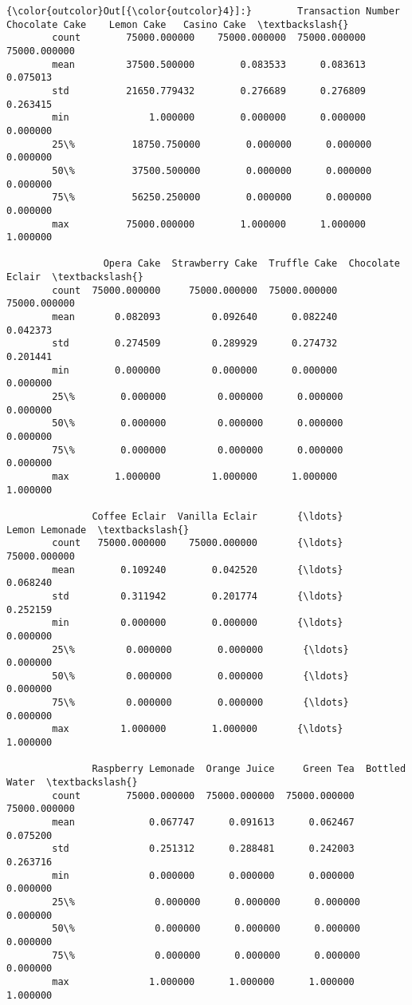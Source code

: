\documentclass[11pt]{article}
\begin{document}
\begin{Verbatim}[commandchars=\\\{\}]
{\color{outcolor}Out[{\color{outcolor}4}]:}        Transaction Number  Chocolate Cake    Lemon Cake   Casino Cake  \textbackslash{}
        count        75000.000000    75000.000000  75000.000000  75000.000000   
        mean         37500.500000        0.083533      0.083613      0.075013   
        std          21650.779432        0.276689      0.276809      0.263415   
        min              1.000000        0.000000      0.000000      0.000000   
        25\%          18750.750000        0.000000      0.000000      0.000000   
        50\%          37500.500000        0.000000      0.000000      0.000000   
        75\%          56250.250000        0.000000      0.000000      0.000000   
        max          75000.000000        1.000000      1.000000      1.000000   
        
                 Opera Cake  Strawberry Cake  Truffle Cake  Chocolate Eclair  \textbackslash{}
        count  75000.000000     75000.000000  75000.000000      75000.000000   
        mean       0.082093         0.092640      0.082240          0.042373   
        std        0.274509         0.289929      0.274732          0.201441   
        min        0.000000         0.000000      0.000000          0.000000   
        25\%        0.000000         0.000000      0.000000          0.000000   
        50\%        0.000000         0.000000      0.000000          0.000000   
        75\%        0.000000         0.000000      0.000000          0.000000   
        max        1.000000         1.000000      1.000000          1.000000   
        
               Coffee Eclair  Vanilla Eclair       {\ldots}         Lemon Lemonade  \textbackslash{}
        count   75000.000000    75000.000000       {\ldots}           75000.000000   
        mean        0.109240        0.042520       {\ldots}               0.068240   
        std         0.311942        0.201774       {\ldots}               0.252159   
        min         0.000000        0.000000       {\ldots}               0.000000   
        25\%         0.000000        0.000000       {\ldots}               0.000000   
        50\%         0.000000        0.000000       {\ldots}               0.000000   
        75\%         0.000000        0.000000       {\ldots}               0.000000   
        max         1.000000        1.000000       {\ldots}               1.000000   
        
               Raspberry Lemonade  Orange Juice     Green Tea  Bottled Water  \textbackslash{}
        count        75000.000000  75000.000000  75000.000000   75000.000000   
        mean             0.067747      0.091613      0.062467       0.075200   
        std              0.251312      0.288481      0.242003       0.263716   
        min              0.000000      0.000000      0.000000       0.000000   
        25\%              0.000000      0.000000      0.000000       0.000000   
        50\%              0.000000      0.000000      0.000000       0.000000   
        75\%              0.000000      0.000000      0.000000       0.000000   
        max              1.000000      1.000000      1.000000       1.000000   
        

\end{Verbatim}
\end{document}
